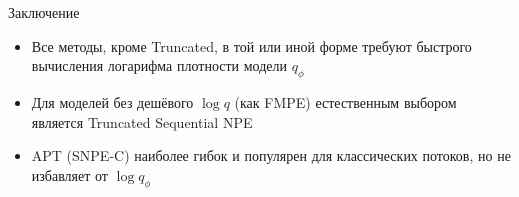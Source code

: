 \documentclass[10pt,aspectratio=169]{beamer}
\begin{document}
\begin{frame}{Заключение}
    \begin{itemize}
        \item Все методы, кроме Truncated, в той или иной форме требуют быстрого вычисления логарифма плотности модели $q_\phi$
        \item Для моделей без дешёвого $\log q$ (как FMPE) естественным выбором является Truncated Sequential NPE
        \item APT (SNPE-C) наиболее гибок и популярен для классических потоков, но не избавляет от $\log q_\phi$
    \end{itemize}
\end{frame}
\end{document}
